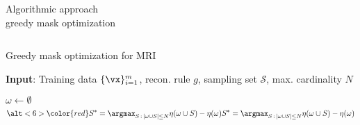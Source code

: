 



\begin{frame}{Algorithmic approach\\[-3mm] {\normalsize greedy mask optimization \parencite{gozcu2018learning}} }

\begin{columns}[T]
\vspace{-.6cm}
\begin{algorithm}[H] 
\caption{Greedy mask optimization for MRI}
\label{alg:g1}
{\footnotesize \textbf{Input}: Training data $\{\vx\}_{i=1}^m$, recon. rule $g$, sampling set $\mathcal{S}$, max. cardinality $N$}%
\begin{algorithmic}[1]
\State $\omega \leftarrow \emptyset$
        \State {}
   	 \State {}
        \State    {}
    \EndFor
   \State {} %
    \vspace{-3mm}
    \begin{equation*}
        \alt<6>{\color{red}S^* = \argmax_{S\,:\,|\omega \cup S| \le N}  \eta(\omega \cup S) - \eta(\omega)}{S^* = \argmax_{S\,:\,|\omega \cup S| \le N}  \eta(\omega \cup S) - \eta(\omega)}%
    \end{equation*}\vspace{-5mm}

\end{algorithmic}
\end{algorithm}
\end{columns}
\end{frame}

